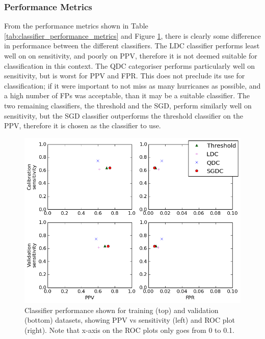\documentclass[pdftex,12pt,a4paper]{report}
\begin{document}
\subsubsection{Performance Metrics}

From the performance metrics shown in Table \ref{tab:classifier_performance_metrics} and Figure
\ref{fig:ppv_and_fpr_vs_sens}, there is clearly some difference in performance between the different
classifiers. The LDC classifier performs least well on on sensitivity, and poorly on PPV, therefore
it is not deemed suitable for classification in this context. The QDC categoriser performs
particularly well on sensitivity, but is worst for PPV and FPR. This does not preclude its use for
classification; if it were important to not miss as many hurricanes as possible, and a high number
of FPs was acceptable, than it may be a suitable classifier. The two
remaining classifiers, the threshold and the SGD, perform similarly well on sensitivity, but the SGD
classifier outperforms the threshold classifier on the PPV, therefore it is chosen as the classifier
to use.


\begin{figure}[hb!]
    \centering
    \includegraphics[width=\textwidth]{figures/ppv_and_fpr_vs_sens}
    \caption{Classifier performance shown for training (top) and validation (bottom) datasets,
        showing PPV vs sensitivity (left) and ROC plot (right). Note that x-axis on the ROC plots only
        goes from 0 to 0.1. }
    \label{fig:ppv_and_fpr_vs_sens}
\end{figure}
\end{document}
